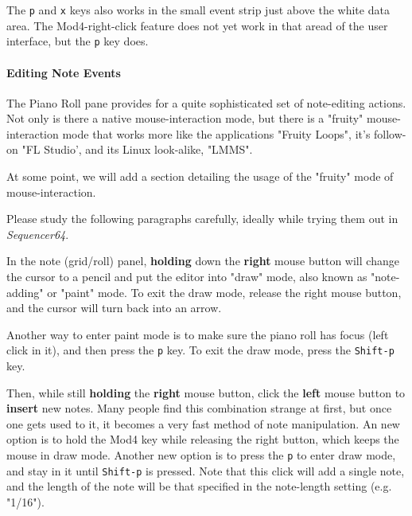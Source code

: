    The \texttt{p} and \texttt{x} keys also works in the small event strip just
   above the white data area.  The Mod4-right-click feature does not
   yet work in that aread of the user interface, but the \texttt{p} key does.

\paragraph{Editing Note Events}
\label{paragraph:seq64_pattern_editor_note_events}

   The Piano Roll pane provides for a quite sophisticated set of note-editing
   actions.  Not only is there a native mouse-interaction mode, but there is a
   "fruity" mouse-interaction mode that works more like the applications
   "Fruity Loops", it's follow-on "FL Studio', and its Linux look-alike,
   "LMMS".

   \setcounter{ItemCounter}{0}      %

   At some point, we will add a section detailing the usage of the "fruity"
   mode of mouse-interaction.

   Please study the following paragraphs carefully, ideally while
   trying them out in \textsl{Sequencer64}.

	In the note (grid/roll) panel, \textbf{holding}
	down the \textbf{right} mouse button will change the cursor
	to a pencil and put the editor into "draw" mode, 
   also known as "note-adding" or "paint" mode.
   To exit the draw mode, release the right mouse button, and the cursor will
   turn back into an arrow.

   Another way to enter paint mode is to make sure the piano roll has focus
   (left click in it), and then press the \texttt{p} key.
   To exit the draw mode, press the \texttt{Shift-p} key.

   Then, while still \textbf{holding} the \textbf{right} mouse button, click
   the \textbf{left} mouse button to \textbf{insert} new notes.  Many people
   find this combination strange at first, but once one gets used to it, it
   becomes a very fast method of note manipulation.  An new option is to
   hold the Mod4 key while releasing the right button, which keeps the mouse
   in draw mode.  Another new option is to press the \texttt{p} to enter draw
   mode, and stay in it until \texttt{Shift-p} is pressed.
   Note that this click will add a single note, and the length of the note will
   be that specified in the note-length setting (e.g. "1/16").

